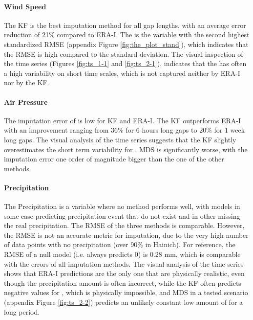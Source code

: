 \documentclass{article}
\begin{document}
\paragraph{Wind Speed} The KF is the best imputation method for all gap lengths, with an average error reduction of 21\% compared to ERA-I. The  is the variable with the second highest standardized RMSE (appendix Figure \ref{fig:the_plot_stand}), which indicates that the RMSE is high compared to the  standard deviation. The visual inspection of the time series (Figures \ref{fig:ts_1-1} and \ref{fig:ts_2-1}), indicates that the  has often a high variability on short time scales, which is not captured neither by ERA-I nor by the KF.

\paragraph{Air Pressure} The imputation error of  is low for KF and ERA-I. The KF outperforms ERA-I with an improvement ranging from 36\% for 6 hours long gaps to 20\% for 1 week long gaps. The visual analysis of the time series suggests that the KF slightly overestimates the short term variability for . MDS is significantly worse, with the imputation error one order of magnitude bigger than the one of the other methods.

\paragraph{Precipitation} The Precipitation is a variable where no method performs well, with models in some case predicting precipitation event that do not exist and in other missing the real precipitation. The RMSE of the three methods is comparable. However, the RMSE is not an accurate metric for  imputation, due to the very high number of data points with no precipitation (over 90\% in Hainich). For reference, the RMSE of a null model (i.e. always predicts 0) is 0.28 \si{mm}, which is comparable with the errors of all imputation methods.
The visual analysis of the time series shows that ERA-I predictions are the only one that are physically realistic, even though the precipitation amount is often incorrect, while the KF often predicts negative values for , which is physically impossible, and MDS in a tested scenario (appendix Figure \ref{fig:ts_2-2}) predicts an unlikely constant low amount of  for a long period.
\end{document}
